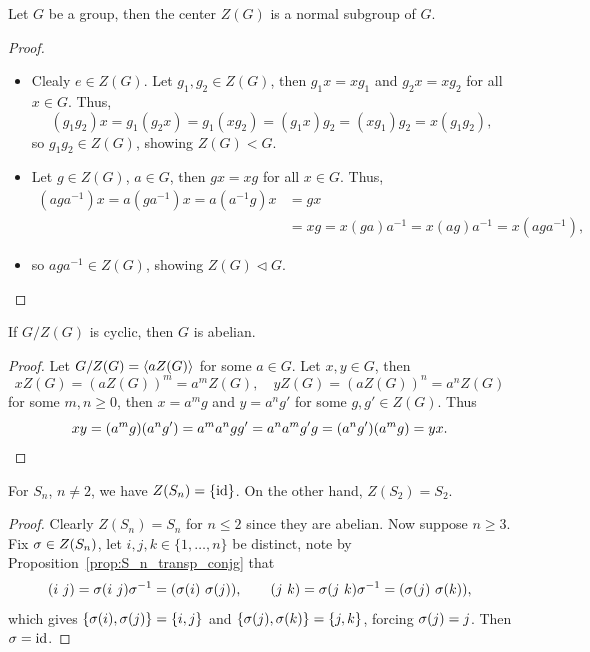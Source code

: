 \begin{proposition}
  Let \(G\) be a group, then the center \(Z(G)\) is a normal subgroup of \(G\).
\end{proposition}
\begin{proof}
  \begin{itemize}
    \item Clealy \(e\in Z(G)\). Let \(g_1,g_2\in Z(G)\), then \(g_1x = xg_1\) and \(g_2x = xg_2\) for all \(x\in G\). Thus, \[
      (g_1g_2)x = g_1(g_2x) = g_1(xg_2) = (g_1x)g_2 = (xg_1)g_2 = x(g_1g_2),
    \] so \(g_1g_2\in Z(G)\), showing \(Z(G) < G\).
    \item Let \(g\in Z(G)\), \(a\in G\), then \(gx = xg\) for all \(x\in G\). Thus, \begin{align*}
      (aga^{-1})x = a(ga^{-1})x = a(a^{-1}g)x &= gx \\
      &= xg = x(ga)a^{-1} = x(ag)a^{-1} = x(aga^{-1}),
    \end{align*}
    \item so \(aga^{-1}\in Z(G)\), showing \(Z(G)\lhd G\). \qedhere
  \end{itemize}
\end{proof}

\newpage
\begin{lemma}
  If \(G/Z(G)\) is cyclic, then \(G\) is abelian.
\end{lemma}
\begin{proof}
  Let \(G/Z(G) = \langle aZ(G)\rangle\) for some \(a\in G\). Let \(x,y\in G\), then \[
    xZ(G) = (aZ(G))^m = a^mZ(G), \quad
    yZ(G) = (aZ(G))^n = a^nZ(G)
  \] for some \(m,n\geq 0\), then \(x = a^m g\) and \(y = a^n g'\) for some \(g,g'\in Z(G)\). Thus \[
    xy = (a^m g)(a^n g') = a^ma^ngg' = a^na^mg'g
    = (a^ng')(a^mg) = yx. \qedhere
  \]
\end{proof}

\begin{example}
  For \(S_n\), \(n\neq 2\), we have \(Z(S_n) = \{\operatorname{id}\}\). On the other hand, \(Z(S_2) = S_2\).
\end{example}
\begin{proof}
  Clearly \(Z(S_n) = S_n\) for \(n\leq 2\) since they are abelian. Now suppose \(n\geq 3\).
  Fix \(\sigma\in Z(S_n)\), let \(i,j,k\in\{1,\ldots,n\}\) be distinct, note by Proposition~\ref{prop:S_n_transp_conjg} that \begin{align*}
    (i\ j) = \sigma(i\ j)\sigma^{-1} = (\sigma(i)\ \sigma(j)), \qquad
    (j\ k) = \sigma(j\ k)\sigma^{-1} = (\sigma(j)\ \sigma(k)),
  \end{align*}
  which gives \(\{\sigma(i),\sigma(j)\} = \{i,j\}\) and \(\{\sigma(j),\sigma(k)\} = \{j,k\}\), forcing \(\sigma(j) = j\). Then \(\sigma = \operatorname{id}\).
\end{proof}

